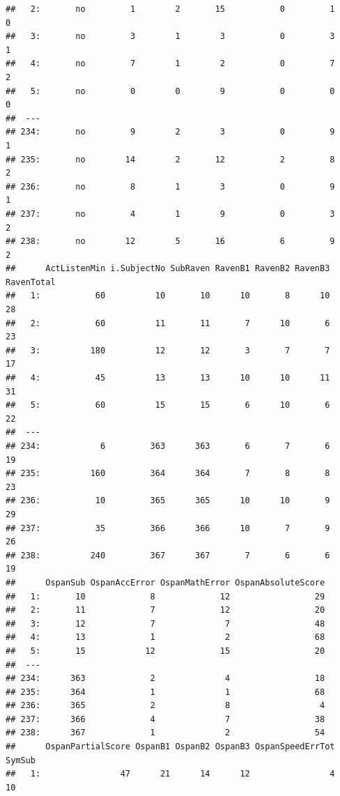 \documentclass[]{book}
\theoremstyle{definition}
\theoremstyle{definition}
\theoremstyle{definition}
\theoremstyle{remark}
\begin{document}
\begin{verbatim}
##   2:       no         1        2       15           0         1        0
##   3:       no         3        1        3           0         3        1
##   4:       no         7        1        2           0         7        2
##   5:       no         0        0        9           0         0        0
##  ---                                                                    
## 234:       no         9        2        3           0         9        1
## 235:       no        14        2       12           2         8        2
## 236:       no         8        1        3           0         9        1
## 237:       no         4        1        9           0         3        2
## 238:       no        12        5       16           6         9        2
##      ActListenMin i.SubjectNo SubRaven RavenB1 RavenB2 RavenB3 RavenTotal
##   1:           60          10       10      10       8      10         28
##   2:           60          11       11       7      10       6         23
##   3:          180          12       12       3       7       7         17
##   4:           45          13       13      10      10      11         31
##   5:           60          15       15       6      10       6         22
##  ---                                                                     
## 234:            6         363      363       6       7       6         19
## 235:          160         364      364       7       8       8         23
## 236:           10         365      365      10      10       9         29
## 237:           35         366      366      10       7       9         26
## 238:          240         367      367       7       6       6         19
##      OspanSub OspanAccError OspanMathError OspanAbsoluteScore
##   1:       10             8             12                 29
##   2:       11             7             12                 20
##   3:       12             7              7                 48
##   4:       13             1              2                 68
##   5:       15            12             15                 20
##  ---                                                         
## 234:      363             2              4                 18
## 235:      364             1              1                 68
## 236:      365             2              8                  4
## 237:      366             4              7                 38
## 238:      367             1              2                 54
##      OspanPartialScore OspanB1 OspanB2 OspanB3 OspanSpeedErrTot SymSub
##   1:                47      21      14      12                4     10

\end{verbatim}
\end{document}
